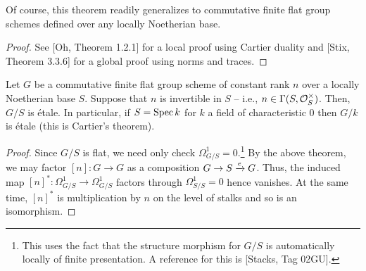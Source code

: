 \documentclass[11pt]{article}
\begin{document}
Of course, this theorem readily generalizes to commutative finite flat group schemes defined over any locally Noetherian base.

\begin{proof}
See [Oh, Theorem 1.2.1] for a local proof using Cartier duality and [Stix, Theorem 3.3.6] for a global proof using norms and traces.
\begin{comment}
Using the flatness of $A$ over $R$, we may assume without loss of generality that $R$ is local and so $A\iso R^n$ as $R$-algebras.\footnote{We could also use the formalism of norms and traces to handle the global case.} Using compatibility under base change, it suffices to show that $\lambda^n=1$ given $\lambda\in G(R)$. Such $\lambda$ may be described as the units of $A^{\vee}$ such that $\Delta_{A^{\vee}}(\lambda)=\lambda\tensor\lambda$ or, equivalently, as the $R$-linear maps $A\to R$ that are invertible and multiplicative. It follows that right multiplication by $\lambda$ induces an $R$-module automorphism of $A^{\vee}$. Since $A$ is free of finite rank, we may identify $A^{\vee}$ with $A$ and obtain an $R$-module automorphism $\tau_{\lambda}$ of $A$. This in turn induces an $R$-module automorphism $\tau:=\id_{A^{\vee}}\tensor\tau_{\lambda}$ of $A^{\vee}\tensor_RA$ which is also an $A$-module automorphism for the natural (free of rank $2$) $A$-module structure. We thus obtain a map 
$$\det_A: \End_A(\End_R(A))\iso\End_A(A^{\vee}\tensor_RA)\to A.$$ 
Since $\tau_{\lambda}\in\Aut_R(A)$, we have $1=\det_A(\id_A)=\det_A(\tau(\id_A))$. Thinking of $\det_A(\tau(\id_A))$ as an element of $A^{\vee}$ using the above identification, we have $\det_A(\tau(\id_A))=\lambda^n$ and so $\lambda^n=1$.
\end{comment}
\end{proof}

\begin{corollary}
Let $G$ be a commutative finite flat group scheme of constant rank $n$ over a locally Noetherian base $S$. Suppose that $n$ is invertible in $S$ -- i.e., $n\in\Gamma(S,\mathcal{O}_S^{\times})$. Then, $G/S$ is \'{e}tale. In particular, if $S=\operatorname{Spec} k$ for $k$ a field of characteristic $0$ then $G/k$ is \'{e}tale (this is Cartier's theorem).
\end{corollary}

\begin{proof}
Since $G/S$ is flat, we need only check $\Omega_{G/S}^1=0$.\footnote{This uses the fact that the structure morphism for $G/S$ is automatically locally of finite presentation. A reference for this is [Stacks, Tag 02GU].} By the above theorem, we may factor $[n]: G\to G$ as a composition $G\to S\xrightarrow{e}G$. Thus, the induced map $[n]^*: \Omega_{G/S}^1\to\Omega_{G/S}^1$ factors through $\Omega_{S/S}^1=0$ hence vanishes. At the same time, $[n]^*$ is multiplication by $n$ on the level of stalks and so is an isomorphism.
\end{proof}
\end{document}
